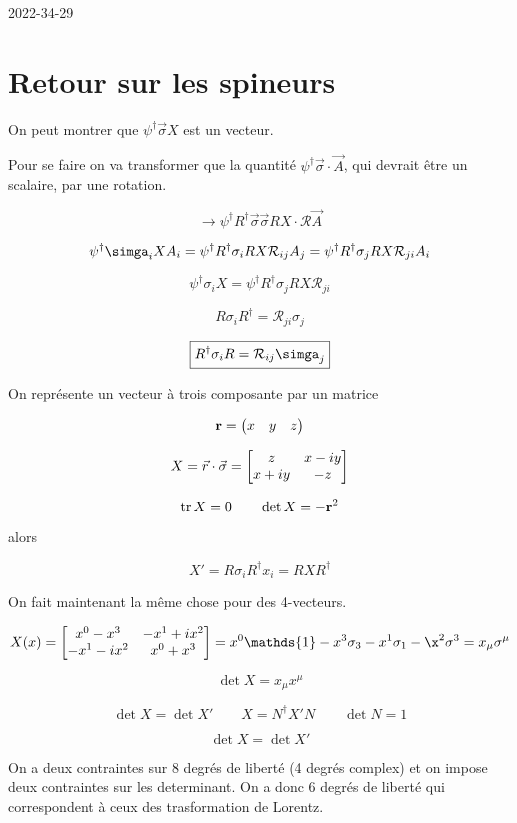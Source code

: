 
\usepackage[final]{pdfpages}


2022-34-29

\section*{Retour sur les spineurs} 


On peut montrer que $\psi ^{\dagger} \vec{\sigma} X$ est un vecteur.

Pour se faire on va transformer que la quantité $\psi ^{\dagger} \vec\sigma \cdot \vec A$, qui devrait être un scalaire, par une rotation. 

$$\to \psi ^{\dagger} R ^{\dagger} \vec \sigma \vec \sigma R X \cdot \mathcal{R} \vec A $$ 

$$\psi ^{\dagger} \simga_i X A_i = \psi ^{\dagger} R ^{\dagger} \sigma_i R X \mathcal{R}_{ij} A_j  = \psi ^{\dagger} R^{\dagger}\sigma_j R X \mathcal{R}_{ji} A_i $$ 

$$\psi ^{\dagger} \sigma_i X = \psi ^{\dagger} R ^{\dagger} \sigma_j R X \mathcal{R}_{ji} $$ 

$$R\sigma_i R ^{\dagger} = \mathcal{R}_{ji} \sigma_j $$ 

$$\boxed{R^{\dagger} \sigma_i R = \mathcal{R} _{ij} \simga_j }$$ 


On représente un vecteur à trois composante par un matrice

$$\vb{r} = \mqty(x & y &z)$$ 

$$X = \vec{r} \cdot \vec\sigma = \mqty[z & x-iy\\x+iy &- z ]$$ 

$$\tr X = 0 \qquad \det X = - \vb{r}^2$$ 

alors


$$X' = R \sigma_i R ^{\dagger} x_i =  RX R ^{\dagger}$$ 


On fait maintenant la même chose pour des 4-vecteurs.


$$X(x)= \mqty[x^{0}-x^{3} & -x^{1}+ix^{2}\\ -x^{1}-ix^{2} & x^{0}+ x^{3}] = x^{0}\mathds{1} - x^{3}\sigma_3 -x^{1}\sigma_1 -\x^{2}\sigma^{3} = x_{\mu} \sigma^{\mu}$$ 

$$\det X = x_{\mu} x^{\mu}$$ 

$$\det X = \det X'\qquad X = N^{\dagger}X'N \qquad \det N =1$$ 

$$\det X = \det X'$$ 

On a deux contraintes sur 8 degrés de liberté (4 degrés complex) et on impose deux contraintes sur les determinant. On a donc 6 degrés de liberté qui correspondent à ceux des trasformation de Lorentz. 




